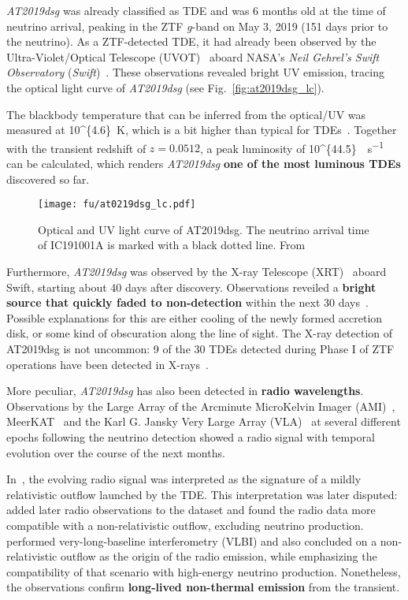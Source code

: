 \emph{AT2019dsg} was already classified as TDE and was 6 months old at the time of neutrino arrival, peaking in the ZTF \textit{g}-band on May 3, 2019 (151 days prior to the neutrino). As a ZTF-detected TDE, it had already been observed by the Ultra-Violet/Optical Telescope (UVOT)~ aboard NASA's \textit{Neil Gehrel's Swift Observatory} (\textit{Swift})~. These observations revealed bright UV emission, tracing the optical light curve of \emph{AT2019dsg} (see Fig.~\ref{fig:at2019dsg_lc}).

The blackbody temperature that can be inferred from the optical/UV was measured at \SI[parse-numbers = false]{10^{4.6}}{\K}, which is a bit higher than typical for TDEs~. Together with the transient redshift of $z=0.0512$, a peak luminosity of \SI[parse-numbers = false]{10^{44.5}}{\erg\per\s} can be calculated, which renders \emph{AT2019dsg} \textbf{one of the most luminous TDEs} discovered so far.


\begin{figure*}[htb]
    \texttt{[image: fu/at0219dsg\_lc.pdf]}
    \caption[AT2019dsg optical/UV light curve]{Optical and UV light curve of AT2019dsg. The neutrino arrival time of IC191001A is marked with a black dotted line. From~\cite{Stein2021}}
\end{figure*}

Furthermore, \emph{AT2019dsg} was observed by the X-ray Telescope (XRT)~ aboard Swift, starting about 40 days after discovery. Observations reveiled a \textbf{bright source that quickly faded to non-detection} within the next 30 days~\cite{Stein2021}. Possible explanations for this are either cooling of the newly formed accretion disk, or some kind of obscuration along the line of sight. The X-ray detection of AT2019dsg is not uncommon: 9 of the 30 TDEs detected during Phase I of ZTF operations have been detected in X-rays~.

More peculiar, \emph{AT2019dsg} has also been detected in \textbf{radio wavelengths}. Observations by the Large Array of the Arcminute MicroKelvin Imager (AMI)~, MeerKAT~ and the Karl G. Jansky Very Large Array (VLA)~ at several different epochs following the neutrino detection showed a radio signal with temporal evolution over the course of the next months.

In~\cite{Stein2021}, the evolving radio signal was interpreted as the signature of a mildly relativistic outflow launched by the TDE. This interpretation was later disputed:~ added later radio observations to the dataset and found the radio data more compatible with a non-relativistic outflow, excluding neutrino production.~ performed very-long-baseline interferometry (VLBI) and also concluded on a non-relativistic outflow as the origin of the radio emission, while emphasizing the compatibility of that scenario with high-energy neutrino production. Nonetheless, the observations confirm \textbf{long-lived non-thermal emission} from the transient.

